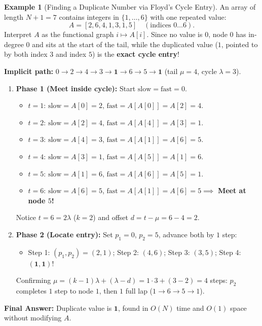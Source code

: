 \documentclass[11pt,a4paper]{article}
\theoremstyle{definition}
\newtheorem{example}{Example}[section]
\begin{document}
\begin{example}[Finding a Duplicate Number via Floyd's Cycle Entry]
An array of length $N + 1 = 7$ contains integers in $\{1, \dots, 6\}$ with one repeated value:
$$A = [2, 6, 4, 1, 3, 1, 5] \quad (\text{indices } 0 \dots 6).$$
Interpret $A$ as the functional graph $i \mapsto A[i]$. Since no value is $0$, node $0$ has in-degree $0$ and sits at the start of the tail, while the duplicated value ($1$, pointed to by both index $3$ and index $5$) is the \textbf{exact cycle entry}!

\textbf{Implicit path:} $0 \to 2 \to 4 \to 3 \to \mathbf{1} \to 6 \to 5 \to \mathbf{1}$ (tail $\mu = 4$, cycle $\lambda = 3$).
\begin{enumerate}[itemsep=2pt, topsep=2pt]
    \item \textbf{Phase 1 (Meet inside cycle):} Start $\text{slow} = \text{fast} = 0$.
    \begin{itemize}[itemsep=1pt, topsep=1pt]
        \item $t = 1$: $\text{slow} = A[0] = 2$, $\text{fast} = A[A[0]] = A[2] = 4$.
        \item $t = 2$: $\text{slow} = A[2] = 4$, $\text{fast} = A[A[4]] = A[3] = 1$.
        \item $t = 3$: $\text{slow} = A[4] = 3$, $\text{fast} = A[A[1]] = A[6] = 5$.
        \item $t = 4$: $\text{slow} = A[3] = 1$, $\text{fast} = A[A[5]] = A[1] = 6$.
        \item $t = 5$: $\text{slow} = A[1] = 6$, $\text{fast} = A[A[6]] = A[5] = 1$.
        \item $t = 6$: $\text{slow} = A[6] = 5$, $\text{fast} = A[A[1]] = A[6] = 5 \implies$ \textbf{Meet at node $5$!}
    \end{itemize}
    Notice $t = 6 = 2\lambda$ ($k = 2$) and offset $d = t - \mu = 6 - 4 = 2$.
    \item \textbf{Phase 2 (Locate entry):} Set $p_1 = 0$, $p_2 = 5$, advance both by $1$ step:
    \begin{itemize}[itemsep=1pt, topsep=1pt]
        \item Step 1: $(p_1, p_2) = (2, 1)$; \quad Step 2: $(4, 6)$; \quad Step 3: $(3, 5)$; \quad Step 4: $(\mathbf{1}, \mathbf{1})$!
    \end{itemize}
    Confirming $\mu = (k - 1)\lambda + (\lambda - d) = 1 \cdot 3 + (3 - 2) = 4$ steps: $p_2$ completes $1$ step to node $1$, then $1$ full lap ($1 \to 6 \to 5 \to 1$).
\end{enumerate}
\textbf{Final Answer:} Duplicate value is $\mathbf{1}$, found in $O(N)$ time and $O(1)$ space without modifying $A$.
\end{example}
\end{document}
